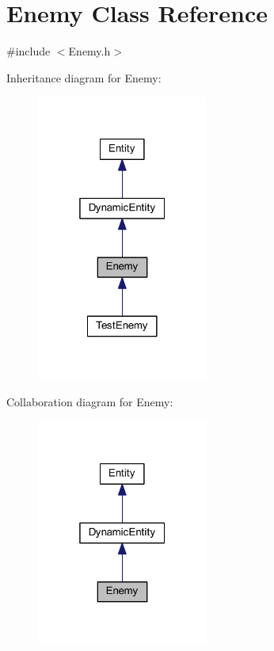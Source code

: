 \hypertarget{class_enemy}{
\section{Enemy Class Reference}
\label{dd/d7a/class_enemy}
}


{\ttfamily \#include $<$Enemy.h$>$}



Inheritance diagram for Enemy:
\nopagebreak
\begin{figure}[H]
\begin{center}
\leavevmode
\includegraphics[width=160pt]{de/ded/class_enemy__inherit__graph}
\end{center}
\end{figure}


Collaboration diagram for Enemy:
\nopagebreak
\begin{figure}[H]
\begin{center}
\leavevmode
\includegraphics[width=160pt]{d6/dc1/class_enemy__coll__graph}
\end{center}
\end{figure}
